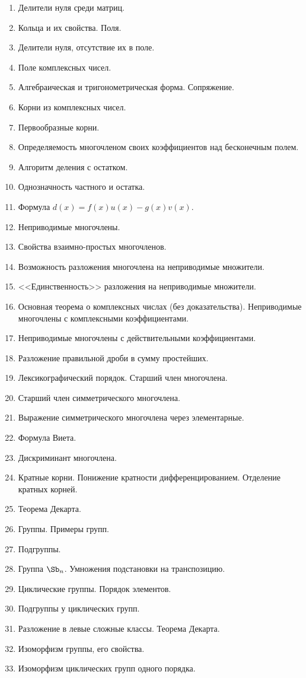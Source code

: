 \documentclass[a4paper]{article}
\begin{document}
\begin{enumerate}
\item  Делители нуля среди матриц.
\item  Кольца и их свойства. Поля.
\item  Делители нуля, отсутствие их в поле.
\item  Поле комплексных чисел.
\item  Алгебраическая и тригонометрическая форма. Сопряжение.
\item  Корни из комплексных чисел.
\item  Первообразные корни.
\item  Определяемость многочленом своих коэффициентов над бесконечным полем.
\item  Алгоритм деления с остатком.
\item  Однозначность частного и остатка.
\item  Формула $d(x) = f(x)u(x) - g(x)v(x)$.
\item  Неприводимые многочлены.
\item  Свойства взаимно-простых многочленов.
\item  Возможность разложения многочлена на неприводимые множители.
\item  <<Единственность>> разложения на неприводимые множители.
\item  Основная теорема о комплексных числах (без доказательства). Неприводимые многочлены с комплексными коэффициентами.
\item  Неприводимые многочлены с действительными коэффициентами.
\item  Разложение правильной дроби в сумму простейших.
\item  Лексикографический порядок. Старший член многочлена.
\item  Старший член симметрического многочлена.
\item  Выражение симметрического многочлена через элементарные.
\item  Формула Виета.
\item  Дискриминант многочлена.
\item  Кратные корни. Понижение кратности дифференцированием. Отделение кратных корней.
\item  Теорема Декарта.
\item  Группы. Примеры групп.
\item  Подгруппы.
\item  Группа $\Sb_n$. Умножения подстановки на транспозицию.
\item  Циклические группы. Порядок элементов.
\item  Подгруппы у циклических групп.
\item  Разложение в левые сложные классы. Теорема Декарта.
\item  Изоморфизм группы, его свойства.
\item  Изоморфизм циклических групп одного порядка.
\end{enumerate}

\medskip\dmvntrail
\end{document}
